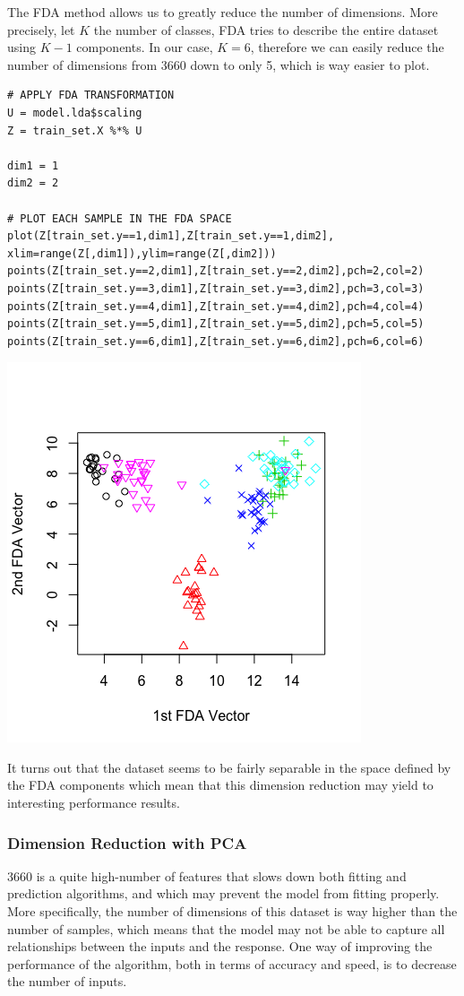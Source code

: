 \documentclass[]{report}
\begin{document}
The FDA method allows us to greatly reduce the number of dimensions. More precisely, let $K$ the number of classes, FDA tries to describe the entire dataset using $K-1$ components. In our case, $K = 6$, therefore we can easily reduce the number of dimensions from 3660 down to only 5, which is way easier to plot.

\begin{lstlisting}
# APPLY FDA TRANSFORMATION
U = model.lda$scaling
Z = train_set.X %*% U

dim1 = 1
dim2 = 2

# PLOT EACH SAMPLE IN THE FDA SPACE
plot(Z[train_set.y==1,dim1],Z[train_set.y==1,dim2], xlim=range(Z[,dim1]),ylim=range(Z[,dim2]))
points(Z[train_set.y==2,dim1],Z[train_set.y==2,dim2],pch=2,col=2)
points(Z[train_set.y==3,dim1],Z[train_set.y==3,dim2],pch=3,col=3)
points(Z[train_set.y==4,dim1],Z[train_set.y==4,dim2],pch=4,col=4)
points(Z[train_set.y==5,dim1],Z[train_set.y==5,dim2],pch=5,col=5)
points(Z[train_set.y==6,dim1],Z[train_set.y==6,dim2],pch=6,col=6)
\end{lstlisting}

\begin{center}
	\includegraphics[width=0.6\linewidth]{Figures/plot_fda_1_2.png}
	\label{fig:plot_fda_1_2}
\end{center}

It turns out that the dataset seems to be fairly separable in the space defined by the FDA components which mean that this dimension reduction may yield to interesting performance results. 

\subsubsection{Dimension Reduction with PCA}
3660 is a quite high-number of features that slows down both fitting and prediction algorithms, and which may prevent the model from fitting properly. More specifically, the number of dimensions of this dataset is way higher than the number of samples, which means that the model may not be able to capture all relationships between the inputs and the response. One way of improving the performance of the algorithm, both in terms of accuracy and speed, is to decrease the number of inputs.
\end{document}
